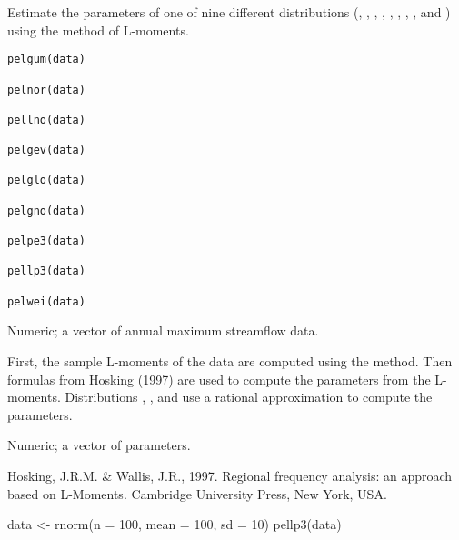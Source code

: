 \documentclass[a4paper]{book}
\begin{document}
%
\begin{Description}
Estimate the parameters of one of nine different distributions (, ,
, , , , , , and ) using the method of L-moments.
\end{Description}
%
\begin{Usage}
\begin{verbatim}
pelgum(data)

pelnor(data)

pellno(data)

pelgev(data)

pelglo(data)

pelgno(data)

pelpe3(data)

pellp3(data)

pelwei(data)
\end{verbatim}
\end{Usage}
%
\begin{Arguments}
\begin{ldescription}
\item[\code{data}] Numeric; a vector of annual maximum streamflow data.
\end{ldescription}
\end{Arguments}
%
\begin{Details}
First, the sample L-moments of the data are computed using the 
method. Then formulas from Hosking (1997) are used to compute the parameters from the
L-moments. Distributions , , and  use a rational approximation to compute
the parameters.
\end{Details}
%
\begin{Value}
Numeric; a vector of parameters.
\end{Value}
%
\begin{References}
Hosking, J.R.M. \& Wallis, J.R., 1997. Regional frequency analysis: an approach based
on L-Moments. Cambridge University Press, New York, USA.
\end{References}
%
\begin{Examples}
\begin{ExampleCode}
data <- rnorm(n = 100, mean = 100, sd = 10)
pellp3(data)

\end{ExampleCode}
\end{Examples}
\end{document}
